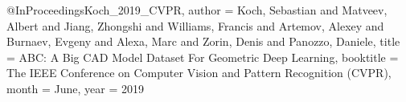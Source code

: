 @InProceedings{Koch_2019_CVPR,
    author = {Koch, Sebastian and Matveev, Albert and Jiang, Zhongshi and Williams, Francis and Artemov, Alexey and Burnaev, Evgeny and Alexa, Marc and Zorin, Denis and Panozzo, Daniele},
    title = {{ABC: A Big CAD Model Dataset For Geometric Deep Learning}},
    booktitle = {The IEEE Conference on Computer Vision and Pattern Recognition (CVPR)},
    month = {June},
    year = {2019}
}
